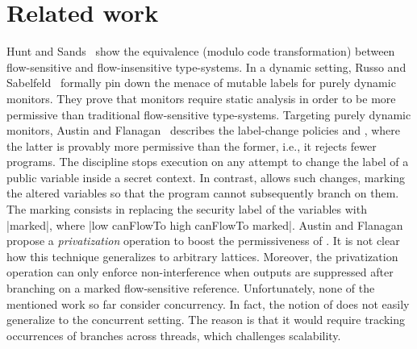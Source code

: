 \section{Related work}
\label{sec:related}


Hunt and Sands~\citep{Hunt:2006} show the equivalence (modulo code
transformation) between flow-sensitive and flow-insensitive type-systems. 
In a dynamic setting, Russo and Sabelfeld~\citep{Russo:2010} formally pin down
the menace of mutable labels for purely dynamic monitors. They prove that
monitors require static analysis in order to be more permissive than traditional
flow-sensitive type-systems. Targeting purely dynamic monitors, Austin and
Flanagan~\citep{Austin:Flanagan:PLAS09,Austin:Flanagan:PLAS10} describes the
label-change policies \emph{\nsu}  and \emph{\pu}, where the
latter is provably more permissive than the former, i.e., it rejects fewer
programs. The {\nsu} discipline stops execution on any attempt to change the
label of a public variable inside a secret context. In contrast, {\pu} allows
such changes, marking the altered variables so that the program cannot
subsequently branch on them. The marking consists in replacing the security
label of the variables with |marked|, where |low canFlowTo high canFlowTo
marked|.  Austin and Flanagan propose a \emph{privatization} operation to boost
the permissiveness of {\pu}.  It is not clear how this technique generalizes to
arbitrary lattices. Moreover, the privatization operation can only enforce
non-interference when outputs are suppressed after branching on a marked
flow-sensitive reference. Unfortunately, none of the mentioned work so far
consider concurrency. In fact, the notion of {\pu} does not easily generalize to
the concurrent setting. The reason is that it would require tracking occurrences
of branches across threads, which challenges scalability.

